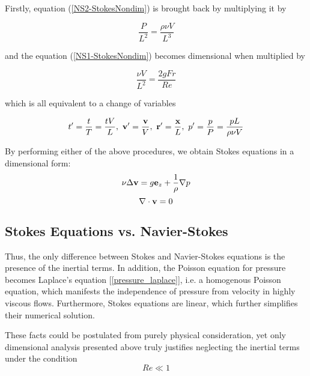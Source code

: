 Firstly, equation (\ref{NS2-StokesNondim}) is brought back by multiplying it by 

$$ \frac{P}{L^2} = \frac{\rho \nu V}{L^3}$$

and the equation (\ref{NS1-StokesNondim}) becomes dimensional when multiplied by 

$$ \frac{\nu V}{L^2} = \frac{2g Fr}{Re}$$

which is all equivalent to a change of variables 

$$ t^{\prime}  = \frac{t}{T} = \frac{tV}{L},~ \mathbf{v^{\prime}} = \frac{\mathbf{v}}{V},~ \mathbf{r^{\prime}} = \frac{\mathbf{x}}{L},~ p^{\prime} = \frac{p}{P} = \frac{pL}{\rho \nu V} $$  

By performing either of the above procedures, we obtain Stokes equations in a dimensional form:
\
\begin{equation} \label{NS1-Stokes}
\nu \Delta\mathbf{v} = g \mathbf{e}_z + \frac{1}{\rho} \nabla p 
\end{equation}
\begin{equation} \label{NS2-Stokes}
\nabla\cdot\mathbf{v} = 0
\end{equation}

\subsection{Stokes Equations vs. Navier-Stokes}

Thus, the only difference between Stokes and Navier-Stokes equations is the presence of the inertial terms. In addition, the Poisson equation for pressure becomes Laplace's equation [\ref{pressure_laplace}], i.e. a homogenous Poisson equation, which manifests the independence of pressure from velocity in highly viscous flows. Furthermore, Stokes equations are linear, which further simplifies their numerical solution.

These facts could be postulated from purely physical consideration, yet only dimensional analysis presented above truly justifies neglecting the inertial terms under the condition $$Re \ll 1 $$